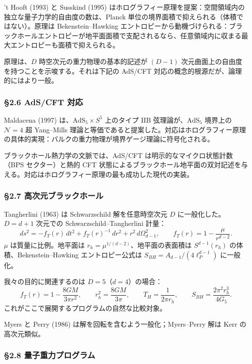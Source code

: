 \documentclass[a4paper,11pt]{ltjsarticle}
\theoremstyle{definition}
\begin{document}
't Hooft (1993) と Susskind (1995)
はホログラフィー原理を提案：空間領域内の独立な量子力学的自由度の数は、Planck
単位の境界面積で抑えられる（体積ではない）。原理は Bekenstein--Hawking
エントロピーから動機づけられる：ブラックホールエントロピーが地平面面積で支配されるなら、任意領域内に収まる最大エントロピーも面積で抑えられる。

原理は、\(D\) 時空次元の重力物理の基本的記述が \((D-1)\)
次元曲面上の自由度を持つことを示唆する。それは下記の AdS/CFT
対応の概念的根源だが、論理的にはより一般。

\subsubsection{§2.6 AdS/CFT 対応}\label{adscft-ux5bfeux5fdc}

Maldacena (1997) は、\(\mathrm{AdS}_5 \times S^5\) 上のタイプ IIB
弦理論が、\(\mathrm{AdS}_5\) 境界上の \(\mathcal{N} = 4\) 超 Yang--Mills
理論と等価であると提案した。対応はホログラフィー原理の具体的実現：バルクの重力物理が境界ゲージ理論に符号化される。

ブラックホール熱力学の文脈では、AdS/CFT は明示的なマイクロ状態計数（BPS
セクター）と熱的 CFT
状態によるブラックホール地平面の双対記述を与える。対応はホログラフィー原理の最も成功した現代の実装。

\subsubsection{§2.7
高次元ブラックホール}\label{ux9ad8ux6b21ux5143ux30d6ux30e9ux30c3ux30afux30dbux30fcux30eb}

Tangherlini (1963) は Schwarzschild 解を任意時空次元 \(D\)
に一般化した。\(D = d + 1\) 次元での Schwarzschild--Tangherlini 計量：
\[ds^2 = -f_T(r)\, dt^2 + f_T(r)^{-1}\, dr^2 + r^2\, d\Omega_{d-1}^2, \qquad f_T(r) = 1 - \frac{\mu}{r^{d-2}}.\]
\(\mu\) は質量に比例。地平面は \(r_h = \mu^{1/(d-2)}\)、地平面の表面積は
\(S^{d-1}(r_h)\) の体積、Bekenstein--Hawking エントロピー公式は
\(S_{BH} = A_{d-1}/(4\ell_P^{d-1})\) に一般化。

我々の目的に関連するのは \(D = 5\)（\(d = 4\)）の場合：
\[f_T(r) = 1 - \frac{8GM}{3\pi r^2}, \qquad r_h^2 = \frac{8GM}{3\pi}, \qquad T_H = \frac{1}{2\pi r_h}, \qquad S_{BH} = \frac{2\pi^2 r_h^3}{4 G_5}.\]
これがここで展開するプログラムの自然な比較対象。

Myers と Perry (1986) は解を回転を含むよう一般化；Myers--Perry 解は Kerr
の高次元類似。

\subsubsection{§2.8
量子重力プログラム}\label{ux91cfux5b50ux91cdux529bux30d7ux30edux30b0ux30e9ux30e0}
\end{document}
